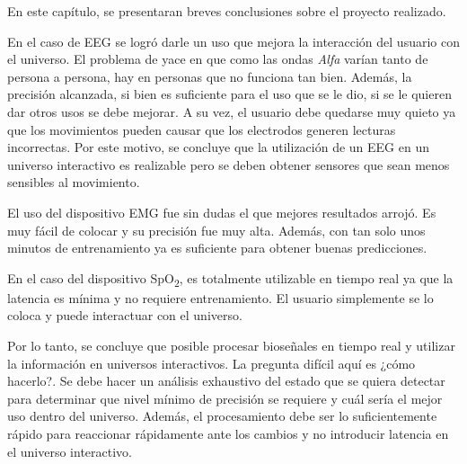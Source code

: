 En este capítulo, se presentaran breves conclusiones sobre el proyecto realizado. 

En el caso de EEG se logró darle un uso que mejora la interacción del usuario con el universo. El problema de yace en que como las ondas \emph{Alfa} varían tanto de persona a persona, hay en personas que no funciona tan bien. Además, la precisión alcanzada, si bien es suficiente para el uso que se le dio, si se le quieren dar otros usos se debe mejorar. A su vez, el usuario debe quedarse muy quieto ya que los movimientos pueden causar que los electrodos generen lecturas incorrectas. Por este motivo, se concluye que la utilización de un EEG en un universo interactivo es realizable pero se deben obtener sensores que sean menos sensibles al movimiento.

El uso del dispositivo EMG fue sin dudas el que mejores resultados arrojó. Es muy fácil de colocar y su precisión fue muy alta. Además, con tan solo unos minutos de entrenamiento ya es suficiente para obtener buenas predicciones.

En el caso del dispositivo SpO\textsubscript{2}, es totalmente utilizable en tiempo real ya que la latencia es mínima y no requiere entrenamiento. El usuario simplemente se lo coloca y puede interactuar con el universo.

Por lo tanto, se concluye que posible procesar bioseñales en tiempo real y utilizar la información en universos interactivos. La pregunta difícil aquí es ¿cómo hacerlo?. Se debe hacer un análisis exhaustivo del estado que se quiera detectar para determinar que nivel mínimo de precisión se requiere y cuál sería el mejor uso dentro del universo. Además, el procesamiento debe ser lo suficientemente rápido para reaccionar rápidamente ante los cambios y no introducir latencia en el universo interactivo.